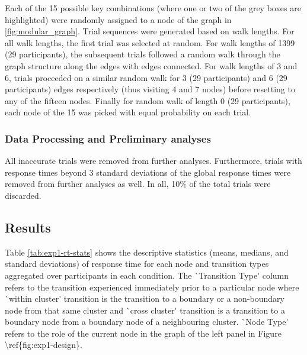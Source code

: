 Each of the 15 possible key combinations (where one or two of the grey boxes are highlighted) were randomly assigned to a node of the graph in \ref{fig:modular_graph}. Trial sequences were generated based on walk lengths. For all walk lengths, the first trial was selected at random. For walk lengths of 1399 (29 participants), the subsequent trials followed a random walk through the graph structure along the edges with edges connected. For walk lengths of 3 and 6, trials proceeded on a similar random walk for 3 (29 participants) and 6 (29 participants) edges respectively (thus visiting 4 and 7 nodes) before resetting to any of the fifteen nodes. Finally for random walk of length 0 (29 participants), each node of the 15 was picked with equal probability on each trial. 


\subsubsection*{Data Processing and Preliminary analyses}
All inaccurate trials were removed from further analyses. Furthermore, trials with response times beyond 3 standard deviations of the global response times were removed from further analyses as well. In all, 10\% of the total trials were discarded. 

\subsection{Results}
Table \ref{tab:exp1-rt-stats} shows the descriptive statistics \ac{(means, medians, and standard deviations)} of response time for each node and transition types \ac{aggregated over participants in each condition. The `Transition Type' column refers to the transition experienced immediately prior to a particular node where `within cluster' transition is the transition to a boundary or a non-boundary node from that same cluster and `cross cluster' transition is a transition to a boundary node from a boundary node of a neighbouring cluster. `Node Type' refers to the role of the current node in the graph of the left panel in Figure \ref{fig:exp1-design}.}

